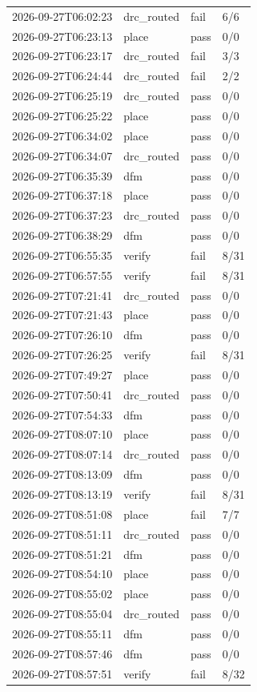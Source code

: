 \documentclass[11pt]{article}
\begin{document}
{\begin{longtable}{llll}
2026-09-27T06:02:23 & drc\_routed & fail & 6/6 \\
2026-09-27T06:23:13 & place & pass & 0/0 \\
2026-09-27T06:23:17 & drc\_routed & fail & 3/3 \\
2026-09-27T06:24:44 & drc\_routed & fail & 2/2 \\
2026-09-27T06:25:19 & drc\_routed & pass & 0/0 \\
2026-09-27T06:25:22 & place & pass & 0/0 \\
2026-09-27T06:34:02 & place & pass & 0/0 \\
2026-09-27T06:34:07 & drc\_routed & pass & 0/0 \\
2026-09-27T06:35:39 & dfm & pass & 0/0 \\
2026-09-27T06:37:18 & place & pass & 0/0 \\
2026-09-27T06:37:23 & drc\_routed & pass & 0/0 \\
2026-09-27T06:38:29 & dfm & pass & 0/0 \\
2026-09-27T06:55:35 & verify & fail & 8/31 \\
2026-09-27T06:57:55 & verify & fail & 8/31 \\
2026-09-27T07:21:41 & drc\_routed & pass & 0/0 \\
2026-09-27T07:21:43 & place & pass & 0/0 \\
2026-09-27T07:26:10 & dfm & pass & 0/0 \\
2026-09-27T07:26:25 & verify & fail & 8/31 \\
2026-09-27T07:49:27 & place & pass & 0/0 \\
2026-09-27T07:50:41 & drc\_routed & pass & 0/0 \\
2026-09-27T07:54:33 & dfm & pass & 0/0 \\
2026-09-27T08:07:10 & place & pass & 0/0 \\
2026-09-27T08:07:14 & drc\_routed & pass & 0/0 \\
2026-09-27T08:13:09 & dfm & pass & 0/0 \\
2026-09-27T08:13:19 & verify & fail & 8/31 \\
2026-09-27T08:51:08 & place & fail & 7/7 \\
2026-09-27T08:51:11 & drc\_routed & pass & 0/0 \\
2026-09-27T08:51:21 & dfm & pass & 0/0 \\
2026-09-27T08:54:10 & place & pass & 0/0 \\
2026-09-27T08:55:02 & place & pass & 0/0 \\
2026-09-27T08:55:04 & drc\_routed & pass & 0/0 \\
2026-09-27T08:55:11 & dfm & pass & 0/0 \\
2026-09-27T08:57:46 & dfm & pass & 0/0 \\
2026-09-27T08:57:51 & verify & fail & 8/32 \\
\hline
\end{longtable}
}
\end{document}
